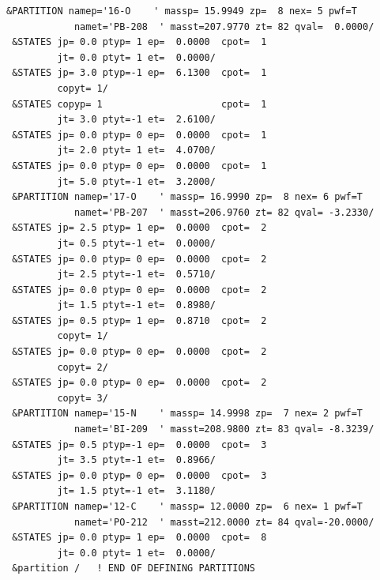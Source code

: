 \documentclass[11pt]{book}
\begin{document}
\begin{small}
\begin{lstlisting}[frame=single]
 &PARTITION namep='16-O    ' massp= 15.9949 zp=  8 nex= 5 pwf=T                 
            namet='PB-208  ' masst=207.9770 zt= 82 qval=  0.0000/               
 &STATES jp= 0.0 ptyp= 1 ep=  0.0000  cpot=  1                                  
         jt= 0.0 ptyt= 1 et=  0.0000/                                           
 &STATES jp= 3.0 ptyp=-1 ep=  6.1300  cpot=  1                                  
         copyt= 1/                                                              
 &STATES copyp= 1                     cpot=  1                                  
         jt= 3.0 ptyt=-1 et=  2.6100/                                           
 &STATES jp= 0.0 ptyp= 0 ep=  0.0000  cpot=  1                                  
         jt= 2.0 ptyt= 1 et=  4.0700/                                           
 &STATES jp= 0.0 ptyp= 0 ep=  0.0000  cpot=  1                                  
         jt= 5.0 ptyt=-1 et=  3.2000/                                           
 &PARTITION namep='17-O    ' massp= 16.9990 zp=  8 nex= 6 pwf=T                 
            namet='PB-207  ' masst=206.9760 zt= 82 qval= -3.2330/               
 &STATES jp= 2.5 ptyp= 1 ep=  0.0000  cpot=  2                                  
         jt= 0.5 ptyt=-1 et=  0.0000/                                           
 &STATES jp= 0.0 ptyp= 0 ep=  0.0000  cpot=  2                                  
         jt= 2.5 ptyt=-1 et=  0.5710/                                           
 &STATES jp= 0.0 ptyp= 0 ep=  0.0000  cpot=  2                                  
         jt= 1.5 ptyt=-1 et=  0.8980/                                           
 &STATES jp= 0.5 ptyp= 1 ep=  0.8710  cpot=  2                                  
         copyt= 1/                                                              
 &STATES jp= 0.0 ptyp= 0 ep=  0.0000  cpot=  2                                  
         copyt= 2/                                                              
 &STATES jp= 0.0 ptyp= 0 ep=  0.0000  cpot=  2                                  
         copyt= 3/                                                              
 &PARTITION namep='15-N    ' massp= 14.9998 zp=  7 nex= 2 pwf=T                 
            namet='BI-209  ' masst=208.9800 zt= 83 qval= -8.3239/               
 &STATES jp= 0.5 ptyp=-1 ep=  0.0000  cpot=  3                                  
         jt= 3.5 ptyt=-1 et=  0.8966/                                           
 &STATES jp= 0.0 ptyp= 0 ep=  0.0000  cpot=  3                                  
         jt= 1.5 ptyt=-1 et=  3.1180/                                           
 &PARTITION namep='12-C    ' massp= 12.0000 zp=  6 nex= 1 pwf=T                 
            namet='PO-212  ' masst=212.0000 zt= 84 qval=-20.0000/               
 &STATES jp= 0.0 ptyp= 1 ep=  0.0000  cpot=  8                                  
         jt= 0.0 ptyt= 1 et=  0.0000/                                           
 &partition /   ! END OF DEFINING PARTITIONS                                    
                                                                                

\end{lstlisting}
\end{small}
\end{document}
